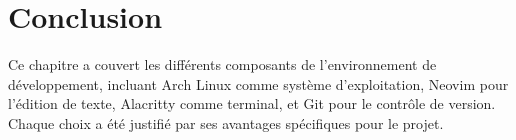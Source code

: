 \newpage

\section*{Conclusion}


\hspace{16pt}Ce chapitre a couvert les différents composants de l'environnement de développement, incluant Arch Linux comme système d'exploitation, Neovim pour l'édition de texte, Alacritty comme terminal, et Git pour le contrôle de version. Chaque choix a été justifié par ses avantages spécifiques pour le projet.
